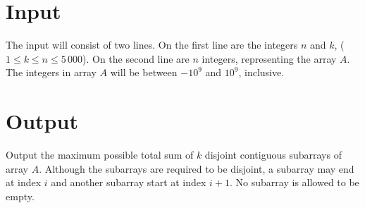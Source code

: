 \section*{Input}
The input will consist of two lines. On the first line are the integers $n$ and $k$, ($1 \leq k \leq n \leq 5\,000$). On the second line are $n$ integers, representing the array $A$. The integers in array $A$ will be between $-10^9$ and $10^9$, inclusive.


\section*{Output}
Output the maximum possible total sum of $k$ disjoint contiguous subarrays of array $A$. Although the subarrays are required to be disjoint, a subarray may end at index $i$ and another subarray start at index $i+1$. No subarray is allowed to be empty.